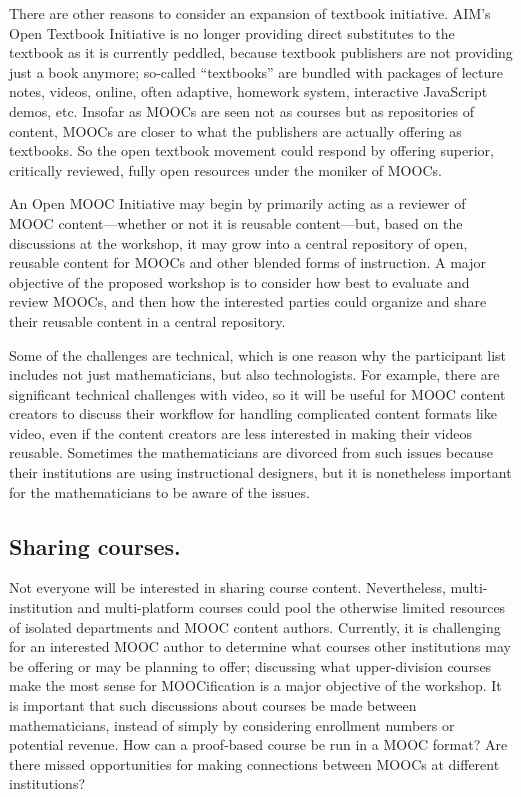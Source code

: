 \documentclass[12pt]{amsart}
\begin{document}
There are other reasons to consider an expansion of textbook
initiative.  AIM's Open Textbook Initiative is no longer providing
direct substitutes to the textbook as it is currently peddled, because
textbook publishers are not providing just a book anymore; so-called
``textbooks'' are bundled with packages of lecture notes, videos,
online, often adaptive, homework system, interactive JavaScript demos,
etc.  Insofar as MOOCs are seen not as courses but as repositories of
content, MOOCs are closer to what the publishers are actually offering
as textbooks.  So the open textbook movement could respond by offering
superior, critically reviewed, fully open resources under the moniker
of MOOCs.

An Open MOOC Initiative may begin by primarily acting as a reviewer of
MOOC content---whether or not it is reusable content---but, based on
the discussions at the workshop, it may grow into a central repository
of open, reusable content for MOOCs and other blended forms of
instruction.  A major objective of the proposed workshop is to
consider how best to evaluate and review MOOCs, and then how the
interested parties could organize and share their reusable content in
a central repository.

Some of the challenges are technical, which is one reason why the
participant list includes not just mathematicians, but also
technologists.  For example, there are significant technical
challenges with video, so it will be useful for MOOC content creators
to discuss their workflow for handling complicated content formats
like video, even if the content creators are less interested in making
their videos reusable.  Sometimes the mathematicians are divorced from
such issues because their institutions are using instructional
designers, but it is nonetheless important for the mathematicians to
be aware of the issues.

\subsection{Sharing courses.}  Not everyone will be interested in
sharing course content.  Nevertheless, multi-institution and
multi-platform courses could pool the otherwise limited resources of
isolated departments and MOOC content authors.  Currently, it is
challenging for an interested MOOC author to determine what courses
other institutions may be offering or may be planning to offer;
discussing what upper-division courses make the most sense for
MOOCification is a major objective of the workshop.  It is important
that such discussions about courses be made between mathematicians,
instead of simply by considering enrollment numbers or potential
revenue.  How can a proof-based course be run in a MOOC format?  Are
there missed opportunities for making connections between MOOCs at
different institutions?
\end{document}
